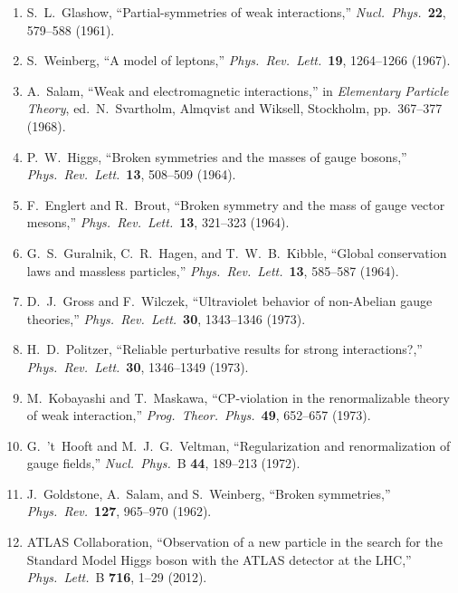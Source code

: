 \documentclass[12pt]{article}
\theoremstyle{definition}
\theoremstyle{remark}
\begin{document}
\begin{enumerate}
\item S.~L.~Glashow, ``Partial-symmetries of weak interactions,'' \textit{Nucl.\ Phys.}\ \textbf{22}, 579--588 (1961).

\item S.~Weinberg, ``A model of leptons,'' \textit{Phys.\ Rev.\ Lett.}\ \textbf{19}, 1264--1266 (1967).

\item A.~Salam, ``Weak and electromagnetic interactions,'' in \textit{Elementary Particle Theory}, ed.\ N.~Svartholm, Almqvist and Wiksell, Stockholm, pp.~367--377 (1968).

\item P.~W.~Higgs, ``Broken symmetries and the masses of gauge bosons,'' \textit{Phys.\ Rev.\ Lett.}\ \textbf{13}, 508--509 (1964).

\item F.~Englert and R.~Brout, ``Broken symmetry and the mass of gauge vector mesons,'' \textit{Phys.\ Rev.\ Lett.}\ \textbf{13}, 321--323 (1964).

\item G.~S.~Guralnik, C.~R.~Hagen, and T.~W.~B.~Kibble, ``Global conservation laws and massless particles,'' \textit{Phys.\ Rev.\ Lett.}\ \textbf{13}, 585--587 (1964).

\item D.~J.~Gross and F.~Wilczek, ``Ultraviolet behavior of non-Abelian gauge theories,'' \textit{Phys.\ Rev.\ Lett.}\ \textbf{30}, 1343--1346 (1973).

\item H.~D.~Politzer, ``Reliable perturbative results for strong interactions?,'' \textit{Phys.\ Rev.\ Lett.}\ \textbf{30}, 1346--1349 (1973).

\item M.~Kobayashi and T.~Maskawa, ``CP-violation in the renormalizable theory of weak interaction,'' \textit{Prog.\ Theor.\ Phys.}\ \textbf{49}, 652--657 (1973).

\item G.~'t~Hooft and M.~J.~G.~Veltman, ``Regularization and renormalization of gauge fields,'' \textit{Nucl.\ Phys.}\ B \textbf{44}, 189--213 (1972).

\item J.~Goldstone, A.~Salam, and S.~Weinberg, ``Broken symmetries,'' \textit{Phys.\ Rev.}\ \textbf{127}, 965--970 (1962).

\item ATLAS Collaboration, ``Observation of a new particle in the search for the Standard Model Higgs boson with the ATLAS detector at the LHC,'' \textit{Phys.\ Lett.}\ B \textbf{716}, 1--29 (2012).


\end{enumerate}
\end{document}
